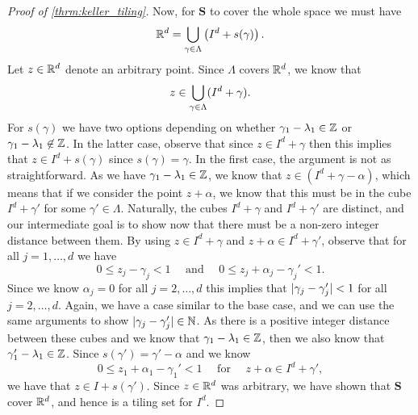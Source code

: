 \documentclass[../thesis.tex]{subfiles}
\begin{document}
\begin{proof}[Proof of \cref{thrm:keller_tiling}]
    Now, for $\mathbf{S}$ to cover the whole space we must have
    \begin{equation*}
        \mathbb{R}^d = \bigcup_{\gamma\in\Lambda} \left(I^d + s(\gamma)\right).
    \end{equation*}
    Let $z\in \mathbb{R}^d$ denote an arbitrary point. Since $\Lambda$ covers $\mathbb{R}^d$, we know that
    \begin{equation*}
        z\in \bigcup_{\gamma\in\Lambda} (I^d + \gamma).
    \end{equation*}
    For $s(\gamma)$ we have two options depending on whether $\gamma_1-\lambda_1 \in\mathbb{Z}$ or $\gamma_1-\lambda_1 \not\in\mathbb{Z}$. In the latter case, observe that since $z\in I^d+\gamma$ then this implies that $z\in I^d+s(\gamma)$ since $s(\gamma) = \gamma$. In the first case, the argument is not as straightforward. As we have $\gamma_1-\lambda_1\in \mathbb{Z}$, we know that $z\in(I^d+\gamma-\alpha)$, which means that if we consider the point $z+\alpha$, we know that this must be in the cube $I^d+\gamma'$ for some $\gamma'\in \Lambda$. Naturally, the cubes $I^d+\gamma$ and $I^d+\gamma'$ are distinct, and our intermediate goal is to show now that there must be a non-zero integer distance between them. By using $z\in I^d+\gamma$ and $z+\alpha \in I^d+\gamma'$, observe that for all $j=1,\dots, d$ we have
    \begin{equation*}
        0 \leq z_j - \gamma_j < 1 \quad \text{ and } \quad 0 \leq z_j + \alpha_j - \gamma_j' < 1.
    \end{equation*}
    Since we know $\alpha_j = 0$ for all $j=2,\dots,d$ this implies that $|\gamma_j-\gamma_j'| <1$ for all $j=2,\dots,d$. Again, we have a case similar to the base case, and we can use the same arguments to show $|\gamma_j-\gamma_j'| \in \mathbb{N}$. As there is a positive integer distance between these cubes and we know that $\gamma_1-\lambda_1 \in\mathbb{Z}$, then we also know that $\gamma_1'-\lambda_1 \in\mathbb{Z}$. Since $s(\gamma') = \gamma'-\alpha$ and we know
    \begin{equation*}
        0\leq z_1+\alpha_1 - \gamma_1' < 1 \quad \text{ for } \quad z+\alpha \in I^d+\gamma',
    \end{equation*}
    we have that $z\in I+s(\gamma')$. Since $z\in\mathbb{R}^d$ was arbitrary, we have shown that $\mathbf{S}$ cover $\mathbb{R}^d$, and hence is a tiling set for $I^d$.
\end{proof}
\end{document}
